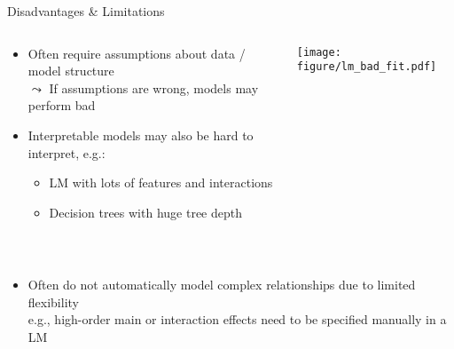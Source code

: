 \documentclass[11pt,compress,t,notes=noshow, aspectratio=169, xcolor=table]{beamer}
\begin{document}
\begin{frame}{Disadvantages \& Limitations}
\begin{columns}[totalwidth=\textwidth]
\begin{column}{0.75\textwidth}
    \begin{itemize}%
    \itemsep1em
        \item<1-> Often require assumptions about data / model structure \\%
        $\leadsto$ If assumptions are wrong, models may perform bad 
        \item<2-> Interpretable models may also be hard to interpret, e.g.:
    \begin{itemize}
        \item LM with lots of features and interactions 
        \item Decision trees with huge tree depth
    \end{itemize}
    \end{itemize}
\end{column}
\begin{column}{0.25\textwidth}
    \begin{center}
        \texttt{[image: figure/lm\_bad\_fit.pdf]} 
    \end{center}
\end{column}
\end{columns}
\quad \\

\begin{itemize}
\itemsep1em
        \item<3-> 
        Often do not automatically model complex relationships due to limited flexibility
        \\
        e.g., high-order main or interaction effects need to be specified manually in a LM


\end{itemize}
\end{frame}
\end{document}
